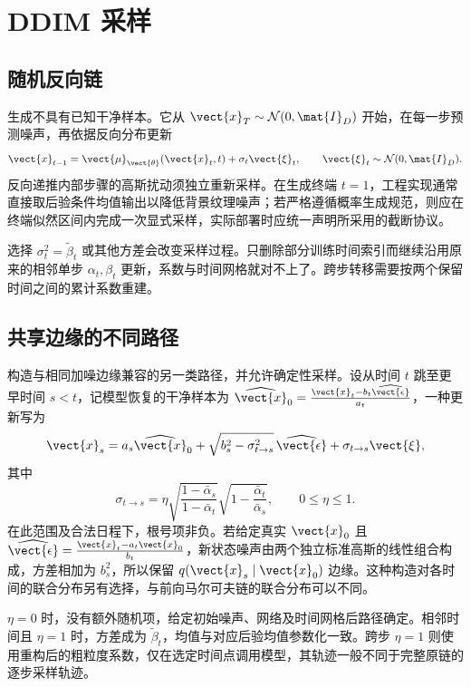 \documentclass[../textbook.tex]{subfiles}
\begin{document}
\section{DDIM 采样}

\subsection{随机反向链}
生成不具有已知干净样本。它从 $\vect{x}_T\sim\mathcal N(0,\mat{I}_D)$ 开始，在每一步预测噪声，再依据反向分布更新
\begin{equation}
 \vect{x}_{t-1}=\vect{\mu}_{\vect{\theta}}(\vect{x}_t,t)+\sigma_t\vect{\xi}_t,\qquad \vect{\xi}_t\sim\mathcal N(0,\mat{I}_D).
\end{equation}
反向递推内部步骤的高斯扰动须独立重新采样。在生成终端 $t=1$，工程实现通常直接取后验条件均值输出以降低背景纹理噪声；若严格遵循概率生成规范，则应在终端似然区间内完成一次显式采样，实际部署时应统一声明所采用的截断协议。

选择 $\sigma_t^2=\widetilde\beta_t$ 或其他方差会改变采样过程。只删除部分训练时间索引而继续沿用原来的相邻单步 $\alpha_t,\beta_t$ 更新，系数与时间网格就对不上了。跨步转移需要按两个保留时间之间的累计系数重建。

\subsection{共享边缘的不同路径}
构造与相同加噪边缘兼容的另一类路径，并允许确定性采样\cite{song2021ddim}。设从时间 $t$ 跳至更早时间 $s<t$，记模型恢复的干净样本为 $\widehat{\vect{x}}_0=\frac{\vect{x}_t-b_t\widehat{\vect{\epsilon}}}{a_t}$，一种更新写为
\begin{equation}
 \vect{x}_s=a_s\widehat{\vect{x}}_0+\sqrt{b_s^2-\sigma_{t\to s}^2}\,\widehat{\vect{\epsilon}}+\sigma_{t\to s}\vect{\xi},
 \label{eq:diff-ddim}
\end{equation}
其中
\begin{equation}
 \sigma_{t\to s}=\eta\sqrt{\frac{1-\bar\alpha_s}{1-\bar\alpha_t}}
 \sqrt{1-\frac{\bar\alpha_t}{\bar\alpha_s}},\qquad 0\le\eta\le1.
\end{equation}
在此范围及合法日程下，根号项非负。若给定真实 $\vect{x}_0$ 且 $\widehat{\vect{\epsilon}}=\frac{\vect{x}_t-a_t\vect{x}_0}{b_t}$，新状态噪声由两个独立标准高斯的线性组合构成，方差相加为 $b_s^2$，所以保留 $q(\vect{x}_s\mid \vect{x}_0)$ 边缘。这种构造对各时间的联合分布另有选择，与前向马尔可夫链的联合分布可以不同。

$\eta=0$ 时，没有额外随机项，给定初始噪声、网络及时间网格后路径确定。相邻时间且 $\eta=1$ 时，方差成为 $\widetilde\beta_t$，均值与对应后验均值参数化一致。跨步 $\eta=1$ 则使用重构后的粗粒度系数，仅在选定时间点调用模型，其轨迹一般不同于完整原链的逐步采样轨迹。
\end{document}
